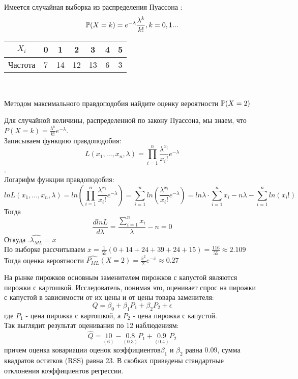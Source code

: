 \documentclass[addpoints, answers]{exam} %
\begin{document}
\begin{questions}
\begin{parts}
\begin{solution}
\end{solution}

\end{parts}

\question Имеется случайная выборка из распределения Пуассона  : 
	\[\P(X=k)=e^{-\lambda}\frac{\lambda^k}{k!}, k=0,1...
	\]
	\begin{center}
	\begin{tabular}{c|cccccc}
 $X_i$ &0 & 1 & 2 & 3 & 4 & 5 \\
  \hline
  Частота & 7 & 14 & 12 & 13 &6 & 3\\
\end{tabular} \\
	\end{center}

Методом максимального правдоподобия найдите оценку вероятности  $\P(X=2)$

\begin{solution}
Для случайной величины, распределенной по закону Пуассона, мы знаем, что $P(X=k)=\frac{\lambda^k}{k!}e^{-\lambda}$.\\ 
Записываем функцию правдоподобия:\\ 
 \[L(x_1,...,x_n,\lambda)=\prod_{i=1}^{n}\frac{\lambda^{x_i}}{x_i!}e^{-\lambda}\].\\
Логарифм функции правдоподобия: \\
 \[lnL(x_1,...,x_n,\lambda)=ln(\prod_{i=1}^{n}\frac{\lambda^{x_i}}{x_i!}e^{-\lambda})=\sum_{i=1}^{n}ln(\frac{\lambda^{x_i}}{x_i!}e^{-\lambda})=ln \lambda\cdot \sum_{i=1}^{n} x_i -n\lambda-\sum_{i=1}^{n}ln(x_i!) \]
Тогда 
 \[
 \frac{d lnL}{d \lambda}=\frac{\sum_{i=1}^{n}x_i}{\lambda}-n=0
 \]
Откуда  .$\hat{\lambda_{ML}}=\overline{x}$\\
По выборке рассчитываем  $\overline{x}=\frac{1}{55}(0+14+24+39+24+15)=\frac{116}{55}\approx 2.109$\\
Тогда оценка вероятности $\hat{P_{ML}}(X=2)=\frac{\overline{x}^2}{2}e^{-\overline{x}}\approx0.27$ 

\end{solution}

\question На рынке пирожков основным заменителем пирожков с капустой являются пирожки с картошкой. Исследователь, понимая это, оценивает спрос на пирожки с капустой в зависимости от их цены и от цены товара заменителя:  
\[ Q=\beta_0+\beta_1P_1+\beta_2P_2+\epsilon
\]
где  $P_1$  - цена пирожка с картошкой, а  $P_2$  - цена пирожка с капустой. \\
Так выглядит результат оценивания по 12 наблюдениям: 
 \[ \hat{Q}=\underset{(6)}{10}-\underset{(0.3)}{0.8}P_1+\underset{(0.4)}{0.9}P_2
 \]
причем оценка ковариации оценок коэффициентов$ \beta_1$ и $\beta_2$ равна 0.09, сумма квадратов остатков (RSS) равна 23. В скобках приведены стандартные отклонения коэффициентов регрессии. 
\begin{parts}

\end{parts}
\end{questions}
\end{document}
